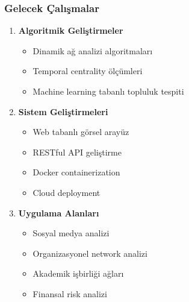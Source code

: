 \documentclass[aspectratio=169]{beamer}
\begin{document}
\begin{frame}
\frametitle{Gelecek Çalışmalar}
\begin{enumerate}
    \item \textbf{Algoritmik Geliştirmeler}
    \begin{itemize}
        \item Dinamik ağ analizi algoritmaları
        \item Temporal centrality ölçümleri
        \item Machine learning tabanlı topluluk tespiti
    \end{itemize}
    
    \item \textbf{Sistem Geliştirmeleri}
    \begin{itemize}
        \item Web tabanlı görsel arayüz
        \item RESTful API geliştirme
        \item Docker containerization
        \item Cloud deployment
    \end{itemize}
    
    \item \textbf{Uygulama Alanları}
    \begin{itemize}
        \item Sosyal medya analizi
        \item Organizasyonel network analizi
        \item Akademik işbirliği ağları
        \item Finansal risk analizi
    \end{itemize}
\end{enumerate}
\end{frame}
\end{document}
